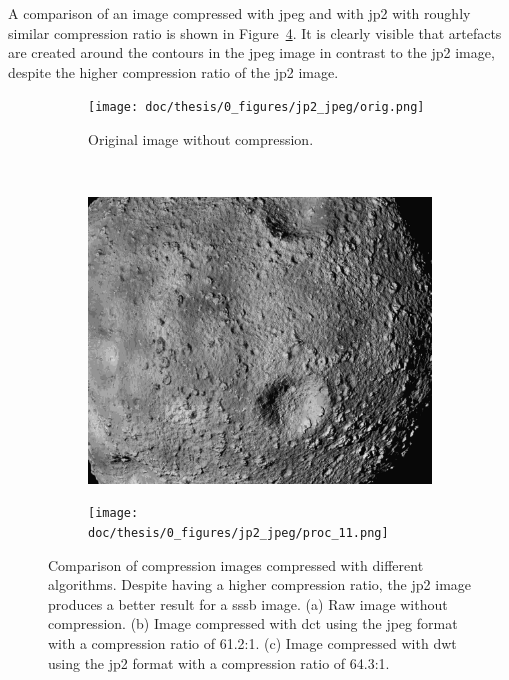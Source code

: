 A comparison of an image compressed with \gls{jpeg} and with \gls{jp2} with roughly similar compression ratio is shown in Figure~\ref{fig:jpg_jp2_comparison}. It is clearly visible that artefacts are created around the contours in the \gls{jpeg} image in contrast to the \gls{jp2} image, despite the higher compression ratio of the \gls{jp2} image.
\begin{figure}[htb]
    \centering
    \begin{subfigure}[b]{0.7\textwidth}
        \texttt{[image: doc/thesis/0\_figures/jp2\_jpeg/orig.png]}
        \caption{Original image without compression.}
        \label{fig:jpg_jp2_oirg}
    \end{subfigure}
    \\
    \begin{subfigure}[b]{0.48\textwidth}
        \includegraphics[width=\textwidth]{doc/thesis/0_figures/jp2_jpeg/proc_5.jpg}
        \caption{}
        \label{fig:jpg_jp2_jpeg}
    \end{subfigure}
    \begin{subfigure}[b]{0.48\textwidth}
        \texttt{[image: doc/thesis/0\_figures/jp2\_jpeg/proc\_11.png]}
        \caption{}
        \label{fig:jpg_jp2_jp2}
    \end{subfigure}
    \caption{Comparison of compression images compressed with different algorithms. Despite having a higher compression ratio, the \gls{jp2} image produces a better result for a \gls{sssb} image. (a) Raw image without compression. (b) Image compressed with \gls{dct} using the \gls{jpeg} format with a compression ratio of 61.2:1. (c) Image compressed with \gls{dwt} using the \gls{jp2} format with a compression ratio of 64.3:1.}
    \label{fig:jpg_jp2_comparison}
\end{figure}

